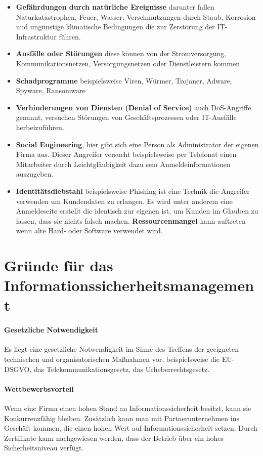 \begin{itemize}
	\item \textbf{Gefährdungen durch natürliche Ereignisse} darunter fallen Naturkatastrophen, Feuer, Wasser, Verschmutzungen durch Staub, Korrosion und ungünstige klimatische Bedingungen die zur Zerstörung der IT-Infrastruktur führen.
	\item \textbf{Ausfälle oder Störungen} diese können von der Stromversorgung, Kommunikationsnetzen, Versorgungsnetzen oder Dienstleistern kommen
	\item \textbf{Schadprogramme} beispielsweise Viren, Würmer, Trojaner, Adware, Spyware, Ransomware
	\item \textbf{Verhinderungen von Diensten (Denial of Service)} auch DoS-Angriffe genannt, versuchen Störungen von Geschäftsprozessen oder IT-Ausfälle herbeizuführen.
	\item \textbf{Social Engineering}, hier gibt sich eine Person als Administrator der eigenen Firma aus. Dieser Angreifer versucht beispielsweise per Telefonat einen Mitarbeiter durch Leichtgläubigkeit dazu  sein Anmeldeinformationen auszugeben.
	\item \textbf{Identitätsdiebstahl} beispielsweise Phishing ist eine Technik die Angreifer verwenden um Kundendaten zu erlangen. Es wird unter anderem eine Anmeldeseite erstellt die identisch zur eigenen ist, um Kunden im Glauben zu lassen, dass sie nichts falsch machen.
	\textbf{Ressourcenmangel} kann auftreten wenn alte Hard- oder Software verwendet wird. 
\end{itemize}

\section{Gründe für das Informationssicherheitsmanagement}
\paragraph{Gesetzliche Notwendigkeit}
Es liegt eine gesetzliche Notwendigkeit im Sinne des Treffens der geeigneten technischen und organisatorischen Maßnahmen vor, beispielsweise die EU-DSGVO, das Telekommunikationsgesetz, das Urheberrechtsgesetz.

\paragraph{Wettbewerbsvorteil}
Wenn eine Firma einen hohen Stand an Informationssicherheit besitzt, kann sie Konkurrenzfähig bleiben. Zusätzlich kann man mit Partnerunternehmen ins Geschäft kommen, die einen hohen Wert auf Informationssicherheit setzen. Durch Zertifikate kann nachgewiesen werden, dass der Betrieb über ein hohes Sicherheitsniveau verfügt.

